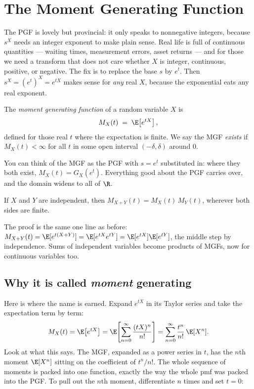 \section{The Moment Generating Function}
\label{ch18:mgf}

The PGF is lovely but provincial: it only speaks to nonnegative integers,
because $s^X$ needs an integer exponent to make plain sense. Real life is full
of continuous quantities --- waiting times, measurement errors, asset returns
--- and for those we need a transform that does not care whether $X$ is integer,
continuous, positive, or negative. The fix is to replace the base $s$ by $e^t$.
Then $s^X = (e^t)^X = e^{tX}$ makes sense for \emph{any} real $X$, because the
exponential eats any real exponent.

\begin{definition}
\label{ch18:def-mgf}
The \emph{moment generating function} of a random variable $X$ is
\[
  M_X(t) \;=\; \E\!\left[e^{tX}\right],
\]
defined for those real $t$ where the expectation is finite. We say the MGF
\emph{exists} if $M_X(t)<\infty$ for all $t$ in some open interval
$(-\delta,\delta)$ around $0$.
\end{definition}

You can think of the MGF as the PGF with $s=e^t$ substituted in: where they both
exist, $M_X(t)=G_X(e^t)$. Everything good about the PGF carries over, and the
domain widens to all of $\R$.

\begin{theorem}
\label{ch18:thm-mgf-product}
If $X$ and $Y$ are independent, then $M_{X+Y}(t)=M_X(t)\,M_Y(t)$, wherever both
sides are finite.
\end{theorem}

The proof is the same one line as before:
$M_{X+Y}(t)=\E[e^{t(X+Y)}]=\E[e^{tX}e^{tY}]=\E[e^{tX}]\E[e^{tY}]$, the middle
step by independence. Sums of independent variables become products of MGFs,
now for continuous variables too.

\subsection{Why it is called \emph{moment} generating}

Here is where the name is earned. Expand $e^{tX}$ in its Taylor series and take
the expectation term by term:
\[
  M_X(t) = \E\!\left[e^{tX}\right]
         = \E\!\left[\sum_{n=0}^\infty \frac{(tX)^n}{n!}\right]
         = \sum_{n=0}^\infty \frac{t^n}{n!}\,\E[X^n].
\]
Look at what this says. The MGF, expanded as a power series in $t$, has the
$n$th moment $\E[X^n]$ sitting on the coefficient of $t^n/n!$. The whole
sequence of moments is packed into one function, exactly the way the whole pmf
was packed into the PGF. To pull out the $n$th moment, differentiate $n$ times
and set $t=0$:

